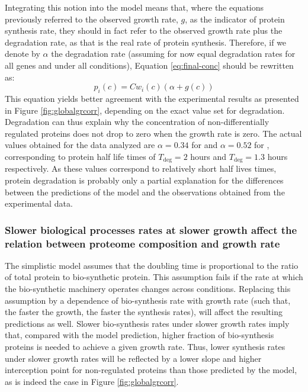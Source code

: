 \documentclass[notitlepage]{article}
\begin{document}
Integrating this notion into the model means that, where the equations previously referred to the observed growth rate, $g$, as the indicator of protein synthesis rate, they should in fact refer to the observed growth rate plus the degradation rate, as that is the real rate of protein synthesis.
Therefore, if we denote by $\alpha$ the degradation rate (assuming for now equal degradation rates for all genes and under all conditions), Equation \ref{eq:final-conc} should be rewritten as:
\begin{equation}
  \label{eq:final-conc-deg}
  p_i(c)=Cw_i(c)(\alpha+g(c))
\end{equation}
This equation yields better agreement with the experimental results as presented in Figure \ref{fig:globalgrcorr}, depending on the exact value set for degradation.
Degradation can thus explain why the concentration of non-differentially regulated proteins does not drop to zero when the growth rate is zero.
The actual values obtained for the data analyzed are $\alpha=0.34$ for \cite{Valgepea2013} and $\alpha=0.52$ for \cite{Heinemann2014}, corresponding to protein half life times of $T_{\text{deg}}=2$ hours and $T_{\text{deg}}=1.3$ hours respectively.
As these values correspond to relatively short half lives times, protein degradation is probably only a partial explanation for the differences between the predictions of the model and the observations obtained from the experimental data.

\subsubsection{Slower biological processes rates at slower growth affect the relation between proteome composition and growth rate}
The simplistic model assumes that the doubling time is proportional to the ratio of total protein to bio-synthetic protein.
This assumption fails if the rate at which the bio-synthetic machinery operates changes across conditions.
Replacing this assumption by a dependence of bio-synthesis rate with growth rate (such that, the faster the growth, the faster the synthesis rates), will affect the resulting predictions as well.
Slower bio-synthesis rates under slower growth rates imply that, compared with the model prediction, higher fraction of bio-synthesis proteins is needed to achieve a given growth rate.
Thus, lower synthesis rates under slower growth rates will be reflected by a lower slope and higher interception point for non-regulated proteins than those predicted by the model, as is indeed the case in Figure \ref{fig:globalgrcorr}.
\end{document}
